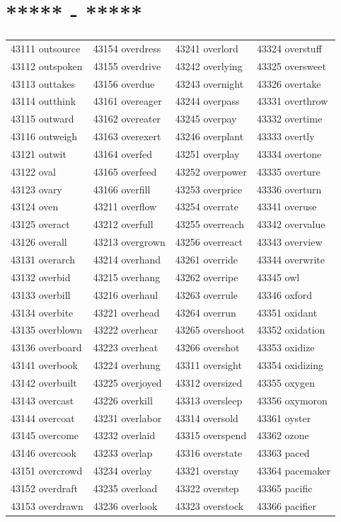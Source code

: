 \documentclass[10pt, oneside]{book}
\begin{document}
\begin{table}[h]
	\centering
	\section*{***** - *****}
	\begin{tabular}{l l l l}
43111 outsource &43154 overdress &43241 overlord &43324 overstuff\\
43112 outspoken &43155 overdrive &43242 overlying &43325 oversweet\\
43113 outtakes &43156 overdue &43243 overnight &43326 overtake\\
43114 outthink &43161 overeager &43244 overpass &43331 overthrow\\
43115 outward &43162 overeater &43245 overpay &43332 overtime\\
43116 outweigh &43163 overexert &43246 overplant &43333 overtly\\
43121 outwit &43164 overfed &43251 overplay &43334 overtone\\
43122 oval &43165 overfeed &43252 overpower &43335 overture\\
43123 ovary &43166 overfill &43253 overprice &43336 overturn\\
43124 oven &43211 overflow &43254 overrate &43341 overuse\\
43125 overact &43212 overfull &43255 overreach &43342 overvalue\\
43126 overall &43213 overgrown &43256 overreact &43343 overview\\
43131 overarch &43214 overhand &43261 override &43344 overwrite\\
43132 overbid &43215 overhang &43262 overripe &43345 owl\\
43133 overbill &43216 overhaul &43263 overrule &43346 oxford\\
43134 overbite &43221 overhead &43264 overrun &43351 oxidant\\
43135 overblown &43222 overhear &43265 overshoot &43352 oxidation\\
43136 overboard &43223 overheat &43266 overshot &43353 oxidize\\
43141 overbook &43224 overhung &43311 oversight &43354 oxidizing\\
43142 overbuilt &43225 overjoyed &43312 oversized &43355 oxygen\\
43143 overcast &43226 overkill &43313 oversleep &43356 oxymoron\\
43144 overcoat &43231 overlabor &43314 oversold &43361 oyster\\
43145 overcome &43232 overlaid &43315 overspend &43362 ozone\\
43146 overcook &43233 overlap &43316 overstate &43363 paced\\
43151 overcrowd &43234 overlay &43321 overstay &43364 pacemaker\\
43152 overdraft &43235 overload &43322 overstep &43365 pacific\\
43153 overdrawn &43236 overlook &43323 overstock &43366 pacifier\\
	\end{tabular}
 \end{table}
\end{document}
